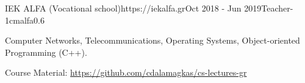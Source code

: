 \documentclass{mycv}
\begin{document}
	\vspace*{0.5cm}	



	\begin{EntryDatedLogo}{IEK ALFA (Vocational school)}{https://iekalfa.gr}{Oct 2018 - Jun 2019}{Teacher}{-1cm}{alfa}{0.6}
		\begin{Itemize}
			\item Computer Networks, Telecommunications, Operating Systems, Object-oriented Programming (C++).
			\item Course Material: \url{https://github.com/cdalamagkas/cs-lectures-gr}
		\end{Itemize}
	\end{EntryDatedLogo}
		


		
\end{document}
